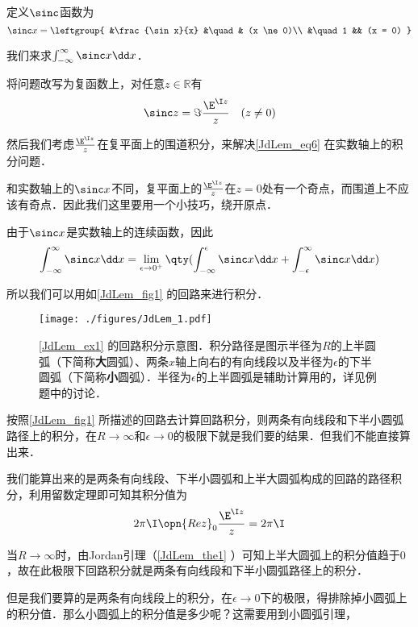 \begin{example}{}\label{JdLem_ex1}

定义$\sinc$函数为
\begin{equation}
\sinc x = 
\leftgroup{
&\frac{\sin x}{x} &\quad & (x \ne 0)\\
&\quad 1 && (x = 0)
}\end{equation}

我们来求$\int_{-\infty}^{\infty}\sinc x\dd x$．

将问题改写为复函数上，对任意$z\in\mathbb{R}$有
\begin{equation}\label{JdLem_eq6}
\sinc z = \Im \frac{\E^{\I z}}{z} \quad  (z \ne 0)
\end{equation}

然后我们考虑$\frac{\E^{\I z}}{z}$在复平面上的围道积分，来解决\autoref{JdLem_eq6} 在实数轴上的积分问题．

和实数轴上的$\sinc x$不同，复平面上的$\frac{\E^{\I z}}{z}$在$z=0$处有一个奇点，而围道上不应该有奇点．因此我们这里要用一个小技巧，绕开原点．

由于$\sinc x$是实数轴上的连续函数，因此
\begin{equation}
\int_{-\infty}^\infty \sinc x \dd x=\lim\limits_{\epsilon\to 0^+}\qty(\int_{-\infty}^\epsilon \sinc x \dd x+\int_{-\epsilon}^\infty \sinc x \dd x)
\end{equation}

所以我们可以用如\autoref{JdLem_fig1} 的回路来进行积分．

\begin{figure}[ht]
\centering
\texttt{[image: ./figures/JdLem\_1.pdf]}
\caption{\autoref{JdLem_ex1} 的回路积分示意图．积分路径是图示半径为$R$的上半圆弧（下简称\textbf{大}圆弧）、两条$x$轴上向右的有向线段以及半径为$\epsilon$的下半圆弧（下简称\textbf{小}圆弧）．半径为$\epsilon$的上半圆弧是辅助计算用的，详见例题中的讨论．} \label{JdLem_fig1}
\end{figure}

按照\autoref{JdLem_fig1} 所描述的回路去计算回路积分，则两条有向线段和下半小圆弧路径上的积分，在$R\to\infty$和$\epsilon\to 0$的极限下就是我们要的结果．但我们不能直接算出来．

我们能算出来的是两条有向线段、下半小圆弧和上半大圆弧构成的回路的路径积分，利用留数定理即可知其积分值为
\begin{equation}\label{JdLem_eq7}
2\pi\I\opn{Rez}_0\frac{\E^{\I z}}{z}=2\pi\I
\end{equation}

当$R\to \infty$时，由Jordan引理（\autoref{JdLem_the1} ）可知上半大圆弧上的积分值趋于$0$，故在此极限下回路积分就是两条有向线段和下半小圆弧路径上的积分．

但是我们要算的是两条有向线段上的积分，在$\epsilon\to 0$下的极限，得排除掉小圆弧上的积分值．那么小圆弧上的积分值是多少呢？这需要用到小圆弧引理，



\end{example}
